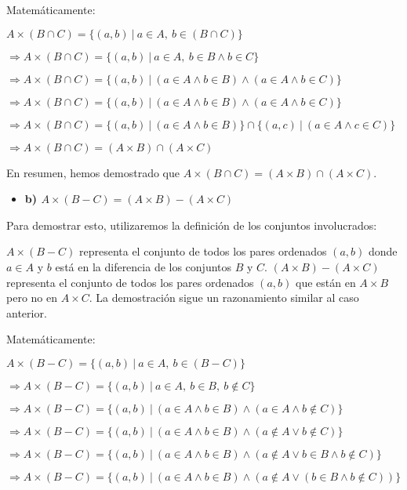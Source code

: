 \documentclass{templateNote}
\begin{document}
Matemáticamente:

$ A \times (B \cap C) = \{ (a, b) \ | \ a \in A, \ b \in (B \cap C) \} $

$ \Rightarrow A \times (B \cap C) = \{ (a, b) \ | \ a \in A, \ b \in B \land b \in C \} $

$ \Rightarrow A \times (B \cap C) = \{ (a, b) \ | \ (a \in A \land b \in B) \land (a \in A \land b \in C) \} $

$ \Rightarrow A \times (B \cap C) = \{ (a, b) \ | \ (a \in A \land b \in B) \land (a \in A \land b \in C) \} $

$ \Rightarrow A \times (B \cap C) = \{ (a, b) \ | \ (a \in A \land b \in B) \} \cap \{ (a, c) \ | \ (a \in A \land c \in C) \} $

$ \Rightarrow A \times (B \cap C) = (A \times B) \cap (A \times C) $

En resumen, hemos demostrado que $A \times (B \cap C) = (A \times B) \cap (A \times C)$.

\begin{itemize}
    \item \textbf{b) $A \times (B - C) = (A \times B) - (A \times C)$}
\end{itemize}

Para demostrar esto, utilizaremos la definición de los conjuntos involucrados:

$A \times (B - C)$ representa el conjunto de todos los pares ordenados $(a, b)$ donde $a \in A$ y $b$ está en la diferencia de los conjuntos $B$ y $C$.
$(A \times B) - (A \times C)$ representa el conjunto de todos los pares ordenados $(a, b)$ que están en $A \times B$ pero no en $A \times C$.
La demostración sigue un razonamiento similar al caso anterior.

Matemáticamente:

$A \times (B - C) = \{ (a, b) \ | \ a \in A, \ b \in (B - C) \}$

$\Rightarrow A \times (B - C) = \{ (a, b) \ | \ a \in A, \ b \in B, \ b \notin C \}$

$\Rightarrow A \times (B - C) = \{ (a, b) \ | \ (a \in A \land b \in B) \land (a \in A \land b \notin C) \}$ 

$\Rightarrow A \times (B - C) = \{ (a, b) \ | \ (a \in A \land b \in B) \land (a \notin A \lor b \notin C) \}$

$\Rightarrow A \times (B - C) = \{ (a, b) \ | \ (a \in A \land b \in B) \land (a \notin A \lor b \in B \land b \notin C) \}$

$\Rightarrow A \times (B - C) = \{ (a, b) \ | \ (a \in A \land b \in B) \land (a \notin A \lor (b \in B \land b \notin C)) \}$
\end{document}
